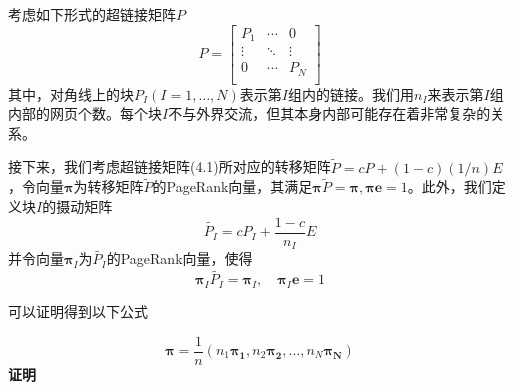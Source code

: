 \documentclass[UTF8,openany]{ctexbook}
\begin{document}
考虑如下形式的超链接矩阵$P$
\begin{equation}
    P=\begin{bmatrix}
        P_1    & \cdots & 0      \\
        \vdots & \ddots & \vdots \\
        0      & \cdots & P_N    \\
    \end{bmatrix}
\end{equation}
其中，对角线上的块$P_I(I=1,\dots,N)$表示第$I$组内的链接。我们用$n_I$来表示第$I$组内部的网页个数。每个块$I$不与外界交流，但其本身内部可能存在着非常复杂的关系。

接下来，我们考虑超链接矩阵(4.1)所对应的转移矩阵$\widetilde{P}=cP+(1-c)(1/n)E$，令向量$\boldsymbol{\pi}$为转移矩阵$\widetilde{P}$的PageRank向量，其满足$\boldsymbol{\pi} \widetilde{P}=\boldsymbol{\pi},\boldsymbol{\pi}\boldsymbol{e}=1$。此外，我们定义块$I$的摄动矩阵
\begin{equation}
    \widetilde{P_I}=cP_I+\frac{1-c}{n_I}E
\end{equation}
并令向量$\boldsymbol{\pi}_I$为$\widetilde{P_I}$的PageRank向量，使得
\begin{equation}
    \boldsymbol{\pi}_I \widetilde{P_I}=\boldsymbol{\pi}_I,\quad\boldsymbol{\pi}_I\boldsymbol{e}=1
\end{equation}

可以证明得到以下公式

\begin{equation}
    \boldsymbol{\pi}=\frac{1}{n}\left(n_1\boldsymbol{\pi_1},n_2\boldsymbol{\pi_2},\dots,n_N\boldsymbol{\pi_N}\right)
\end{equation}
\textbf{证明}
\end{document}

